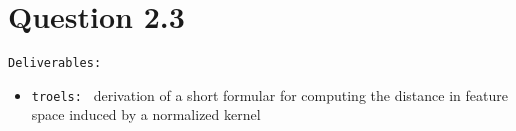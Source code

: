 \section*{Question 2.3}

\texttt{Deliverables:} 
\begin{itemize}
	
	\item \texttt{troels: } derivation of a short formular for computing the distance in feature space induced by a normalized kernel 
\end{itemize}
